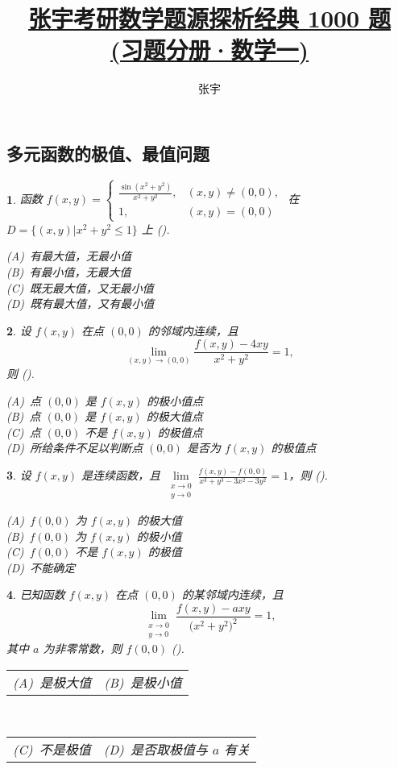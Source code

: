 \documentclass[openany,twocolumn]{ctexbook}
\title{\href{https://github.com/sikouhjw/zhangyu1000}{张宇考研数学题源探析经典 1000 题\\(习题分册·数学一)}}
\author{张宇}
\makeatletter
\theoremstyle{change}
\newtheorem{ti}{}[section]
\def\kuo{ (\hspace{1pc})}
\newcommand{\twoch}[4]{\noindent\begin{tabular}{*{2}{@{}p{3.94cm}}}(A)~#1 & (B)~#2\end{tabular}\\\begin{tabular}{*{2}{@{}p{3.94cm}}}(C)~#3 & (D)~#4\end{tabular}}  %
\newcommand{\onech}[4]{\noindent(A)~#1 \\ (B)~#2 \\ (C)~#3 \\ (D)~#4}  %
\def\leq{\leqslant}
\edef\lim{\lim\limits}
\makeatother
\begin{document}
	
	\subsection{多元函数的极值、最值问题}

	\begin{ti}
		函数 $f(x,y) = \begin{cases}
			\frac{\sin ( x^{2} + y^{2} )}{x^{2} + y^{2}}, & (x,y) \ne (0,0),\\
			1, & (x,y) = (0,0)
		\end{cases}$ 在 $D = \bigl\{ (x,y) \bigl| x^{2} + y^{2} \leq 1 \bigr\}$ 上\kuo.

		\onech{有最大值，无最小值}{有最小值，无最大值}{既无最大值，又无最小值}{既有最大值，又有最小值}
	\end{ti}

	\begin{ti}
		设 $f(x,y)$ 在点 $(0,0)$ 的邻域内连续，且
		\[
			\lim_{(x,y) \to (0,0)} \frac{f(x,y) - 4xy}{x^{2} + y^{2}} = 1,
		\]
		则\kuo.

		\onech{点 $(0,0)$ 是 $f(x,y)$ 的极小值点}{点 $(0,0)$ 是 $f(x,y)$ 的极大值点}{点 $(0,0)$ 不是 $f(x,y)$ 的极值点}{所给条件不足以判断点 $(0,0)$ 是否为 $f(x,y)$ 的极值点}
	\end{ti}

	\begin{ti}
		设 $f(x,y)$ 是连续函数，且 $\lim_{\substack{x \to 0\\ y \to 0}} \frac{f(x,y) - f(0,0)}{x^{3} + y^{3} - 3x^{2} - 3y^{2}} = 1$，则\kuo.

		\onech{$f(0,0)$ 为 $f(x,y)$ 的极大值}{$f(0,0)$ 为 $f(x,y)$ 的极小值}{$f(0,0)$ 不是 $f(x,y)$ 的极值}{不能确定}
	\end{ti}

	\begin{ti}
		已知函数 $f(x,y)$ 在点 $(0,0)$ 的某邻域内连续，且
		\[
			\lim_{\substack{x \to 0\\ y \to 0}} \frac{f(x,y) - axy}{\bigl( x^{2} + y^{2} \bigr)^{2}} = 1,
		\]
		其中 $a$ 为非零常数，则 $f(0,0)$\kuo.

		\twoch{是极大值}{是极小值}{不是极值}{是否取极值与 $a$ 有关}
	\end{ti}
\end{document}
